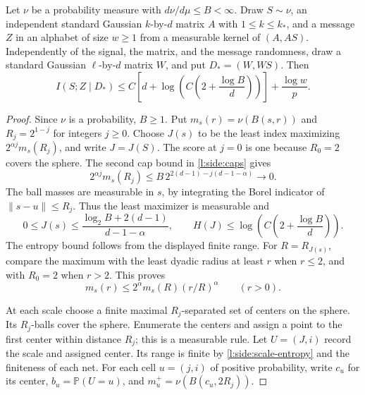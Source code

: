 \begin{lemma}
\label{l:side:adaptive}
Let $\nu$ be a probability measure with $d\nu/d\mu\le B<\infty$.
Draw $S\sim\nu$, an independent
standard Gaussian $k$-by-$d$ matrix $A$ with $1\le k\le k_*$, and a
message $Z$ in an alphabet of size $w\ge1$ from a measurable kernel of
$(A,AS)$.  Independently of the signal, the matrix, and the message
randomness, draw a standard Gaussian $\ell$-by-$d$ matrix $W$, and put
$D_*=(W,WS)$.  Then
\begin{equation}\label{l:side:adaptive-bound}
 I(S;Z\mid D_*)\le
 C\left[d+\log\left(C\left(2+\frac{\log B}{d}\right)\right)\right]
 +\frac{\log w}{p}.
\end{equation}
\end{lemma}

\begin{proof}
Since $\nu$ is a probability, $B\ge1$.  Put
$m_s(r)=\nu(B(s,r))$ and $R_j=2^{1-j}$ for integers $j\ge0$.
Choose $J(s)$ to be the least index maximizing
$2^{\alpha j}m_s(R_j)$, and write $J=J(S)$.  The score at $j=0$ is one because $R_0=2$
covers the sphere.  The second cap bound in \eqref{l:side:caps} gives
\[
 2^{\alpha j}m_s(R_j)
 \le B\,2^{2(d-1)-j(d-1-\alpha)}\longrightarrow0.
\]
The ball masses are measurable in $s$, by integrating the Borel indicator
of $\|s-u\|\le R_j$.  Thus the least maximizer is measurable and
\begin{equation}\label{l:side:scale-entropy}
 0\le J(s)\le\frac{\log_2 B+2(d-1)}{d-1-\alpha},\qquad
 H(J)\le\log\left(C\left(2+\frac{\log B}{d}\right)\right).
\end{equation}
The entropy bound follows from the displayed finite range.  For
$R=R_{J(s)}$, compare the maximum with the least dyadic radius at least
$r$ when $r\le2$, and with $R_0=2$ when $r>2$.  This proves
\begin{equation}\label{l:side:adaptive-growth}
 m_s(r)\le2^\alpha m_s(R)(r/R)^\alpha\qquad(r>0).
\end{equation}

At each scale choose a finite maximal $R_j$-separated set of centers on
the sphere.  Its $R_j$-balls cover the sphere.  Enumerate the centers and
assign a point to the first center within distance $R_j$; this is a
measurable rule.  Let $U=(J,i)$ record the scale and assigned center.
Its range is finite by \eqref{l:side:scale-entropy} and the finiteness of each net.
For each cell $u=(j,i)$ of positive probability, write $c_u$ for its
center, $b_u=\mathbb P(U=u)$, and
$m_u^+=\nu(B(c_u,2R_j))$.


\end{proof}
